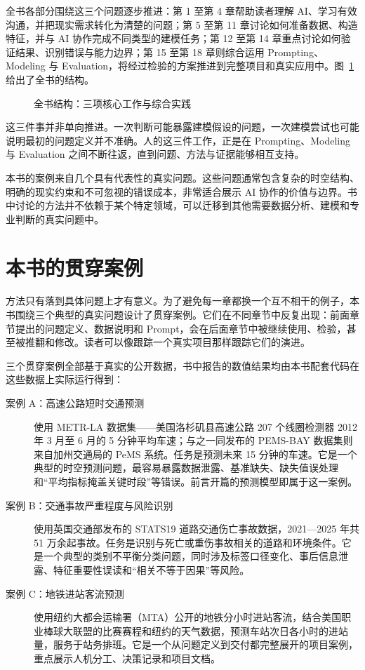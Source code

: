 全书各部分围绕这三个问题逐步推进：第 1 至第 4 章帮助读者理解 AI、学习有效沟通，并把现实需求转化为清楚的问题；第 5 至第 11 章讨论如何准备数据、构造特征，并与 AI 协作完成不同类型的建模任务；第 12 至第 14 章重点讨论如何验证结果、识别错误与能力边界；第 15 至第 18 章则综合运用 Prompting、Modeling 与 Evaluation，将经过检验的方案推进到完整项目和真实应用中。图~\ref{fig:preface_roadmap} 给出了全书的结构。

\begin{figure}[H]
  \centering
  \caption{全书结构：三项核心工作与综合实践}
  \label{fig:preface_roadmap}
\end{figure}

这三件事并非单向推进。一次判断可能暴露建模假设的问题，一次建模尝试也可能说明最初的问题定义并不准确。人的这三件工作，正是在 Prompting、Modeling 与 Evaluation 之间不断往返，直到问题、方法与证据能够相互支持。

本书的案例来自几个具有代表性的真实问题。这些问题通常包含复杂的时空结构、明确的现实约束和不可忽视的错误成本，非常适合展示 AI 协作的价值与边界。书中讨论的方法并不依赖于某个特定领域，可以迁移到其他需要数据分析、建模和专业判断的真实问题中。

\section*{本书的贯穿案例}

方法只有落到具体问题上才有意义。为了避免每一章都换一个互不相干的例子，本书围绕三个典型的真实问题设计了贯穿案例。它们在不同章节中反复出现：前面章节提出的问题定义、数据说明和 Prompt，会在后面章节中被继续使用、检验，甚至被推翻和修改。读者可以像跟踪一个真实项目那样跟踪它们的演进。

三个贯穿案例全部基于真实的公开数据，书中报告的数值结果均由本书配套代码在这些数据上实际运行得到：

\begin{description}
  \item[案例 A：高速公路短时交通预测] 使用 METR-LA 数据集\cite{li2018dcrnn}——美国洛杉矶县高速公路 207 个线圈检测器 2012 年 3 月至 6 月的 5 分钟平均车速；与之一同发布的 PEMS-BAY 数据集则来自加州交通局的 PeMS 系统\cite{chen2001pems}。任务是预测未来 15 分钟的车速。它是一个典型的时空预测问题，最容易暴露数据泄露、基准缺失、缺失值误处理和“平均指标掩盖关键时段”等错误。前言开篇的预测模型即属于这一案例。
  \item[案例 B：交通事故严重程度与风险识别] 使用英国交通部发布的 STATS19 道路交通伤亡事故数据\cite{dft2026stats19}，2021—2025 年共 51 万余起事故。任务是识别与死亡或重伤事故相关的道路和环境条件。它是一个典型的类别不平衡分类问题，同时涉及标签口径变化、事后信息泄露、特征重要性误读和“相关不等于因果”等风险。
  \item[案例 C：地铁进站客流预测] 使用纽约大都会运输署（MTA）公开的地铁分小时进站客流\cite{mta2025hourly}，结合美国职业棒球大联盟的比赛赛程和纽约的天气数据，预测车站次日各小时的进站量，服务于站务排班。它是一个从问题定义到交付都完整展开的项目案例，重点展示人机分工、决策记录和项目文档。
\end{description}

